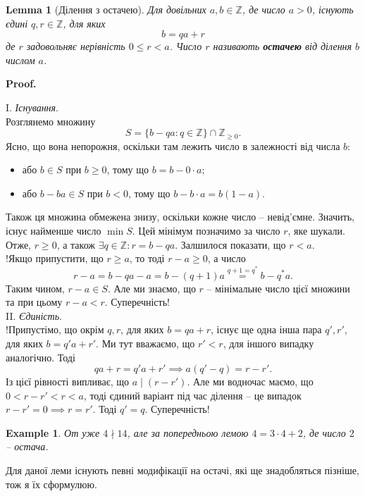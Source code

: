 \documentclass[a4paper, 10pt]{article}
\makeatletter
\theoremstyle{theoremdd}
\theoremstyle{theoremdd}
\theoremstyle{theoremdd}
\theoremstyle{theoremdd}
\newtheorem{example}[theorem]{Example}
\theoremstyle{theoremdd}
\theoremstyle{theoremdd}
\theoremstyle{theoremdd}
\newtheorem{lemma}[theorem]{Lemma}
\theoremstyle{theoremdd}
\renewenvironment{proof}[1][Proof.\\]{\par
\pushQED{\hfill \qed}%
\normalfont \topsep6\p@\@plus6\p@\relax
\trivlist
\item\relax
{\bfseries
#1\@addpunct{.}}\hspace\labelsep\ignorespaces
}{%
\popQED\endtrivlist\@endpefalse
}
\makeatother
\begin{document}
\begin{lemma}[Ділення з остачею]
Для довільних $a,b \in \mathbb{Z}$, де число $a > 0$, існують єдині $q,r \in \mathbb{Z}$, для яких \[
b = qa + r
\]
де $r$ задовольняє нерівність $0 \leq r < a$. Число $r$ називають \textbf{остачею} від ділення $b$ числом $a$.
\end{lemma}

\begin{proof}
I. \textit{Існування}.\\
Розглянемо множину \[
S = \{b - qa : q \in \mathbb{Z}\} \cap \mathbb{Z}_{\geq 0}. 
\]
Ясно, що вона непорожня, оскільки там лежить число в залежності від числа $b$:
\begin{itemize}[nosep,wide=0pt]
\item або $b \in S$ при $b \geq 0$, тому що $b = b - 0 \cdot a$;
\item або $b - ba \in S$ при $b < 0$, тому що $b-b \cdot a = b(1-a)$.
\end{itemize}
Також ця множина обмежена знизу, оскільки кожне число -- невід'ємне. Значить, існує найменше число $\min S$. Цей мінімум позначимо за число $r$, яке шукали.\\
Отже, $r \geq 0$, а також $\exists q \in \mathbb{Z}: r = b -qa$. Залшилося показати, що $r < a$.\\
!Якщо припустити, що $r \geq a$, то тоді $r - a \geq 0$, а число
\[
r - a = b-qa - a = b - (q+1)a \overset{q+1 = q^*}{=} b-q^* a.
\]
Таким чином, $r-a \in S$. Але ми знаємо, що $r$ -- мінімальне число цієї множини та при цьому $r - a < r$. Суперечність!
\bigskip \\
II. \textit{Єдиність}.\\
!Припустімо, що окрім $q,r$, для яких $b = qa + r$, існує ще одна інша пара $q',r'$, для яких $b = q'a + r'$. Ми тут вважаємо, що $r' < r$, для іншого випадку аналогічно. Тоді
\[
qa + r = q'a + r' \implies a(q'-q) = r - r'.
\]
Із цієї рівності випливає, що $a \mid (r-r')$. Але ми водночас маємо, що $0 < r - r' < r < a$, тоді єдиний варіант під час ділення -- це випадок $r-r' = 0 \implies r = r'$. Тоді $q' = q$. Суперечність!
\end{proof}

\begin{example}
От уже $4 \nmid 14$, але за попередньою лемою $4 = 3 \cdot 4 + 2$, де число $2$ -- остача.
\end{example}

Для даної леми існують певні модифікації на остачі, які ще знадобляться пізніше, тож я їх сформулюю.
\end{document}
